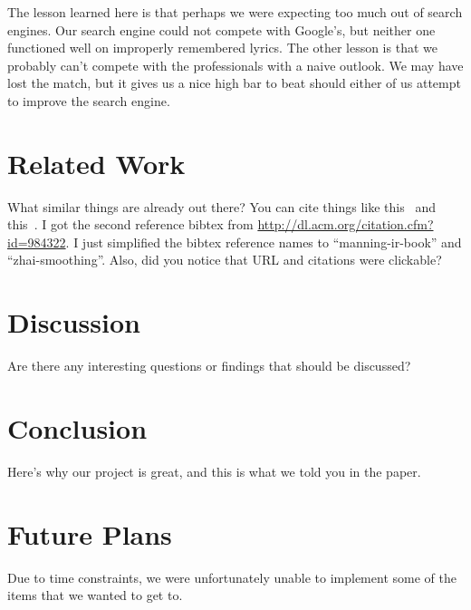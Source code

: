 \documentclass{acm} %
\begin{document}
\begin{CJK}{UTF8}{zhsong}

The lesson learned here is that perhaps we were expecting too much out of search engines. Our search engine could not compete with Google's, but neither one functioned well on improperly remembered lyrics. The other lesson is that we probably can't compete with the professionals with a naive outlook. We may have lost the match, but it gives us a nice high bar to beat should either of us attempt to improve the search engine.



\section{Related Work}

What similar things are already out there? You can cite things like
this~\cite{manning-ir-book} and this~\cite{zhai-smoothing}. I got the second
reference bibtex from \url{http://dl.acm.org/citation.cfm?id=984322}. I just
simplified the bibtex reference names to ``manning-ir-book'' and
``zhai-smoothing''. Also, did you notice that URL and citations were clickable?

\section{Discussion}

Are there any interesting questions or findings that should be discussed?

\section{Conclusion}

Here's why our project is great, and this is what we told you in the paper.

\section{Future Plans}

Due to time constraints, we were unfortunately unable to implement some of the items that we wanted to get to.


\end{CJK}
\end{document}
